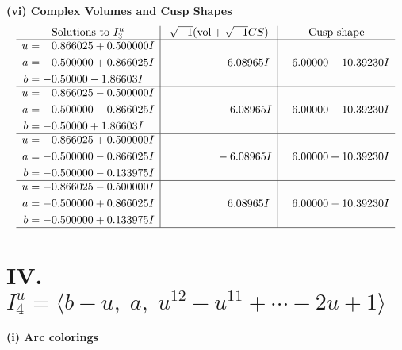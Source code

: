 \documentclass[1p]{elsarticle_modified}
\theoremstyle{definition}
\newcommand{\I}{\sqrt{-1}}
\begin{document}
\newpage\flushleft \textbf{(vi) Complex Volumes and Cusp Shapes}
$$\begin{array}{c|c|c}  
\text{Solutions to }I^u_{3}& \I (\text{vol} + \sqrt{-1}CS) & \text{Cusp shape}\\
 \hline 
\begin{aligned}
u &= \phantom{-}0.866025 + 0.500000 I \\
a &= -0.500000 + 0.866025 I \\
b &= -0.50000 - 1.86603 I\end{aligned}
 & \phantom{-0.000000 -}6.08965 I & \phantom{-}6.00000 - 10.39230 I \\ \hline\begin{aligned}
u &= \phantom{-}0.866025 - 0.500000 I \\
a &= -0.500000 - 0.866025 I \\
b &= -0.50000 + 1.86603 I\end{aligned}
 & \phantom{-0.000000 } -6.08965 I & \phantom{-}6.00000 + 10.39230 I \\ \hline\begin{aligned}
u &= -0.866025 + 0.500000 I \\
a &= -0.500000 - 0.866025 I \\
b &= -0.500000 - 0.133975 I\end{aligned}
 & \phantom{-0.000000 } -6.08965 I & \phantom{-}6.00000 + 10.39230 I \\ \hline\begin{aligned}
u &= -0.866025 - 0.500000 I \\
a &= -0.500000 + 0.866025 I \\
b &= -0.500000 + 0.133975 I\end{aligned}
 & \phantom{-0.000000 -}6.08965 I & \phantom{-}6.00000 - 10.39230 I\\
 \hline 
 \end{array}$$\newpage\newpage\renewcommand{\arraystretch}{1}
\centering \section*{IV. $I^u_{4}= \langle b- u,\;a,\;u^{12}- u^{11}+\cdots-2 u+1 \rangle$}
\flushleft \textbf{(i) Arc colorings}\\
\end{document}
